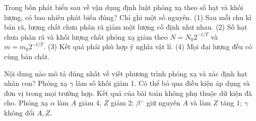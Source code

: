 \begin{ex}
Trong bốn phát biểu sau về vận dụng định luật phóng xạ theo số hạt và khối lượng, có bao nhiêu phát biểu đúng? Chỉ ghi một số nguyên. (1) Sau mỗi chu kì bán rã, lượng chất chưa phân rã giảm một lượng cố định như nhau. (2) Số hạt chưa phân rã và khối lượng chất phóng xạ giảm theo $N=N_0 2^{-t/T}$ và $m=m_0 2^{-t/T}$. (3) Kết quả phải phù hợp ý nghĩa vật lí. (4) Mọi đại lượng đều có cùng bản chất.
\end{ex}

\begin{ex}
Nội dung nào mô tả đúng nhất về viết phương trình phóng xạ và xác định hạt nhân con?
\choice
{Phóng xạ $\gamma$ làm số khối giảm 1.}
{Có thể bỏ qua điều kiện áp dụng và đơn vị trong mọi trường hợp.}
{Kết quả của bài toán không phụ thuộc dữ kiện đã cho.}
{\True Phóng xạ $\alpha$ làm $A$ giảm 4, $Z$ giảm 2; $\beta^-$ giữ nguyên $A$ và làm $Z$ tăng 1; $\gamma$ không đổi $A,Z$.}
\end{ex}

